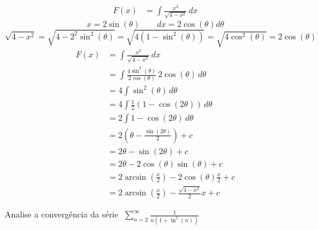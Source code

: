 \documentclass[a4paper,12pt,fleqn]{article}
\begin{document}
\begin{answer}
  \begin{align*}
    F(x)
    & = \int \frac{x^2}{\sqrt{4-x^2}}\,dx
  \end{align*}
  \[
    x = 2\sin(\theta) \qquad dx = 2\cos(\theta) d\theta
  \]
  \[
    \sqrt{4-x^2}
    = \sqrt{4-2^2\sin^2(\theta)}
    = \sqrt{4\left(1-\sin^2(\theta)\right)}
    = \sqrt{4\cos^2(\theta)}
    = 2\cos(\theta)
  \]
  \begin{align*}
    F(x)
    & = \int \frac{x^2}{\sqrt{4-x^2}}\,dx \\
    & = \int \frac{4\sin^2(\theta)}{2\cos(\theta)}\,2\cos(\theta)\,d\theta \\
    & = 4 \int \sin^2(\theta)\,d\theta \\
    & = 4 \int \frac{1}{2}\left(1-\cos(2\theta)\right)\,d\theta \\
    & = 2 \int 1-\cos(2\theta)\,d\theta \\
    & = 2 \left(\theta - \frac{\sin(2\theta)}{2}\right) + c \\
    & = 2\theta - \sin(2\theta) + c \\
    & = 2\theta - 2\cos(\theta)\sin(\theta) + c \\
    & = 2\arcsin\left(\frac{x}{2}\right) - 2\cos(\theta)\frac{x}{2} + c \\
    & = 2\arcsin\left(\frac{x}{2}\right) - \frac{\sqrt{4-x^2}}{2}x + c
  \end{align*}

\end{answer}

Analise a convergência da série \(\;\sum_{n=2}^\infty \frac{1}{n\left(1+\ln^2(n)\right)}\)
\end{document}
